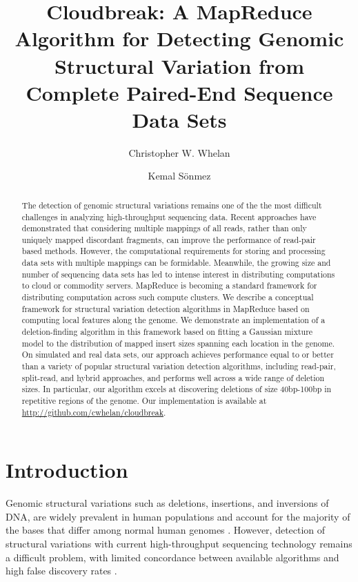 \documentclass[11pt]{article}
\begin{document}
\title{Cloudbreak: A MapReduce Algorithm for Detecting Genomic Structural Variation from Complete Paired-End Sequence Data Sets}

\author{Christopher W. Whelan \and Kemal S\"onmez}

\maketitle

\begin{abstract}
The detection of genomic structural variations remains one of the the most difficult challenges in analyzing high-throughput sequencing data. Recent approaches have demonstrated that considering multiple mappings of all reads, rather than only uniquely mapped discordant fragments, can improve the performance of read-pair based methods. However, the computational requirements for storing and processing data sets with multiple mappings can be formidable. Meanwhile, the growing size and number of sequencing data sets has led to intense interest in distributing computations to cloud or commodity servers. MapReduce is becoming a standard framework for distributing computation across such compute clusters. We describe a conceptual framework for structural variation detection algorithms in MapReduce based on computing local features along the genome. We demonstrate an implementation of a deletion-finding algorithm in this framework based on fitting a Gaussian mixture model to the distribution of mapped insert sizes spanning each location in the genome. On simulated and real data sets, our approach achieves performance equal to or better than a variety of popular structural variation detection algorithms, including read-pair, split-read, and hybrid approaches, and performs well across a wide range of deletion sizes. In particular, our algorithm excels at discovering deletions of size 40bp-100bp in repetitive regions of the genome. Our implementation is available at \url{http://github.com/cwhelan/cloudbreak}.
\end{abstract}

\newpage

\section{Introduction}

Genomic structural variations such as deletions, insertions, and inversions of DNA, are widely prevalent in human populations and account for the majority of the bases that differ among normal human genomes \autocite{Mills:2011p1611, Conrad:2010ja}. However, detection of structural variations with current high-throughput sequencing technology remains a difficult problem, with limited concordance between available algorithms and high false discovery rates \autocite{Mills:2011p1611}.
\end{document}
